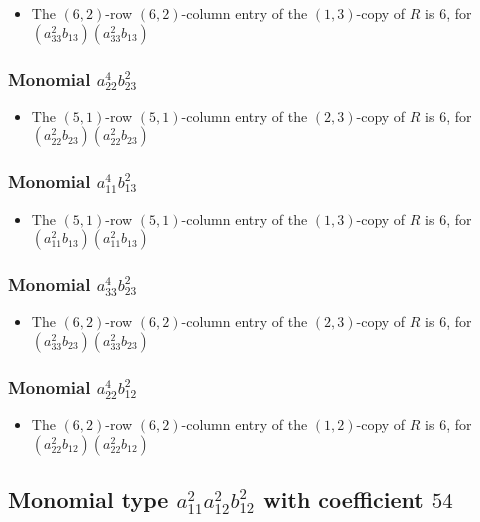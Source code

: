 \documentclass{article}
\begin{document}
\begin{itemize}
\item The $(6, 2)$-row $(6, 2)$-column entry of the $ \left(1, 3\right) $-copy of $R$ is $ 6 $, for $( a_{33}^{2} b_{13} )( a_{33}^{2} b_{13} )$ 
\end{itemize}
\subsubsection{Monomial $ a_{22}^{4} b_{23}^{2} $}

\begin{itemize}
\item The $(5, 1)$-row $(5, 1)$-column entry of the $ \left(2, 3\right) $-copy of $R$ is $ 6 $, for $( a_{22}^{2} b_{23} )( a_{22}^{2} b_{23} )$ 
\end{itemize}
\subsubsection{Monomial $ a_{11}^{4} b_{13}^{2} $}

\begin{itemize}
\item The $(5, 1)$-row $(5, 1)$-column entry of the $ \left(1, 3\right) $-copy of $R$ is $ 6 $, for $( a_{11}^{2} b_{13} )( a_{11}^{2} b_{13} )$ 
\end{itemize}
\subsubsection{Monomial $ a_{33}^{4} b_{23}^{2} $}

\begin{itemize}
\item The $(6, 2)$-row $(6, 2)$-column entry of the $ \left(2, 3\right) $-copy of $R$ is $ 6 $, for $( a_{33}^{2} b_{23} )( a_{33}^{2} b_{23} )$ 
\end{itemize}
\subsubsection{Monomial $ a_{22}^{4} b_{12}^{2} $}

\begin{itemize}
\item The $(6, 2)$-row $(6, 2)$-column entry of the $ \left(1, 2\right) $-copy of $R$ is $ 6 $, for $( a_{22}^{2} b_{12} )( a_{22}^{2} b_{12} )$ 
\end{itemize}
\subsection{Monomial type $ a_{11}^{2} a_{12}^{2} b_{12}^{2} $ with coefficient $ 54 $}
\end{document}
